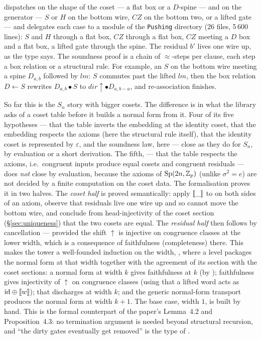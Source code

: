 \noindent {} dispatches on the shape of the coset --- a flat box or a
$D$-spine --- and on the generator --- $S$ or $H$ on the bottom wire,
$CZ$ on the bottom two, or a lifted gate --- and delegates each case to
a module of the \texttt{Pushing} directory (26 files, 5\,600 lines):
$S$ and $H$ through a flat box, $CZ$ through a flat box, $CZ$ meeting a
$D$ box and a flat box, a lifted gate through the spine.  The residual
$b'$ lives one wire up, as the type says.  The soundness proof
 is a chain of $\approx$-steps per clause, each step a
box relation or a structural rule.  For example, an $S$ on the bottom
wire meeting a spine $D_{a,b}$ followed by $\mathit{lm}$: $S$ commutes
past the lifted $\mathit{lm}$, then the box relation
$D \leftarrow S$ rewrites $D_{a,b} \bullet S$ to $\mathit{dir}{\uparrow}
\bullet D_{a,b-a}$, and re-association finishes.

So far this is the $S_n$ story with bigger cosets.  The difference is in
what the library asks of a coset table before it builds a normal form
from it.  Four of its five hypotheses --- that the table inverts the
embedding at the identity coset, that the embedding respects the axioms
(here the structural rule  itself), that the identity coset
is represented by $\varepsilon$, and the soundness law, here
 --- close as they do for $S_n$, by evaluation or a
short derivation.  The fifth,  --- that the table respects
the axioms, i.e.\ congruent inputs produce equal cosets and congruent
residuals --- does \emph{not} close by evaluation, because the axioms of $\mathrm{Sp}(2n,\mathbb{Z}_p)$ (unlike
$\sigma^2 = e$) are not decided by a finite computation on the coset
data.  The formalisation proves it in two halves.  The \emph{coset half}
is proved semantically: apply $[\![\_]\!]$ to  on both
sides of an axiom, observe that residuals live one wire up and so cannot
move the bottom wire, and conclude from head-injectivity of the coset
section (\S\ref{sec:uniqueness}) that the two cosets are equal.  The
\emph{residual half} then follows by cancellation --- provided the shift
$\uparrow$ is injective on congruence classes at the lower width, which
is a consequence of faithfulness (completeness) there.  This makes the
tower a well-founded induction on the width, , where a level packages the normal form at that width
together with the agreement of its section with the coset sections: a
normal form at width $k$ gives faithfulness at $k$ (by
); faithfulness gives injectivity of $\uparrow$
on congruence classes (using that a lifted word acts as $\mathrm{id}
\oplus [\![w]\!]$); that discharges  at width $k$; and the
generic normal-form transport produces the normal form at width
$k{+}1$.  The base case, width $1$, is built by hand.  This is the
formal counterpart
of the paper's Lemma~4.2 and Proposition~4.3: no termination argument is
needed beyond structural recursion, and ``the dirty gates eventually get
removed'' is the type of .

